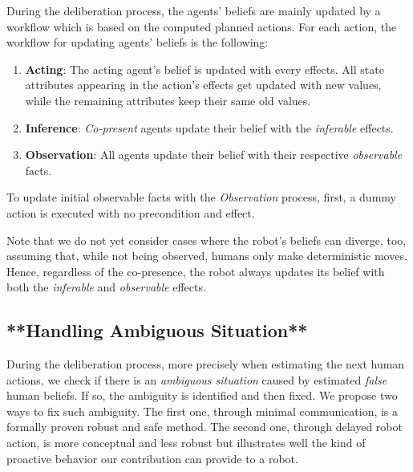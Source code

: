 \documentclass[letterpaper]{article} %
\begin{document}
During the deliberation process, the agents' beliefs are mainly updated by a workflow which is based on the computed planned actions. 
For each action, the workflow for updating agents' beliefs is the following: 

\begin{enumerate}
    \item \textbf{Acting}: The acting agent's belief is updated with every effects. All state attributes appearing in the action's effects get updated with new values, while the remaining attributes keep their same old values.

    \item \textbf{Inference}: \textit{Co-present} agents update their belief with the \textit{inferable} effects.

    \item \textbf{Observation}: All agents update their belief with their respective \textit{observable} facts.
\end{enumerate}

To update initial observable facts with the \textit{Observation} process, first, a dummy action is executed with no precondition and effect.

Note that we do not yet consider cases where the robot's beliefs can diverge, too, assuming that, while not being observed, humans only make deterministic moves. Hence, regardless of the co-presence, the robot always updates its belief with both the \textit{inferable} and \textit{observable} effects.

\subsection{**Handling Ambiguous Situation**}

During the deliberation process, more precisely when estimating the next human actions, we check if there is an \textit{ambiguous situation} caused by estimated \textit{false} human beliefs. If so, the ambiguity is identified and then fixed. We propose two ways to fix such ambiguity. The first one, through minimal communication, is a formally proven robust and safe method. The second one, through delayed robot action, is more conceptual and less robust but illustrates well the kind of proactive behavior our contribution can provide to a robot.
\end{document}
